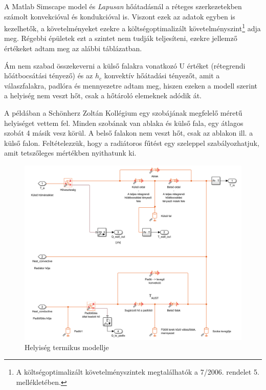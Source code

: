 A Matlab Simscape model és \textit{Lapusan} \cite{LAPUSAN2016320}
 hőátadásnál a réteges szerkezetekben számolt konvekcióval és kondukcióval is. Viszont ezek az adatok egyben is kezelhetők, a követelményeket ezekre a költségoptimalizált követelményszint\footnote{ A  költségoptimalizált követelményszintek megtalálhatók a 7/2006. rendelet \cite{TNM2006} 5. mellékletében.} adja meg. Régebbi épületek ezt a szintet nem tudják teljesíteni, ezekre jellemző értékeket adtam meg az alábbi táblázatban. 

Ám nem szabad összekeverni a külső falakra vonatkozó U értéket (rétegrendi hőátbocsátási tényező) és az $h_c$ konvektív hőátadási tényezőt, amit a válaszfalakra, padlóra és mennyezetre adtam meg, hiszen ezeken a modell szerint a helyiség nem veszt hőt, csak a hőtároló elemeknek adódik át.

 A példában a Schönherz Zoltán Kollégium egy szobájának megfelelő méretű helyiséget vettem fel. Minden szobának van ablaka és külső fala, egy átlagos szobát 4 másik vesz körül. A belső falakon nem veszt hőt, csak az ablakon ill. a külső falon. Feltételezzük, hogy a radiátoros fűtést egy szeleppel szabályozhatjuk, amit tetszőleges mértékben nyithatunk ki.

\begin{figure}[H]
	\centering
	\includegraphics[trim=0 12 5 0, clip,width=\textwidth]{figures/SimscapeHouse}
	\caption{Helyiség termikus modellje}
	\label{fig:SimscapeHouse}
\end{figure}

